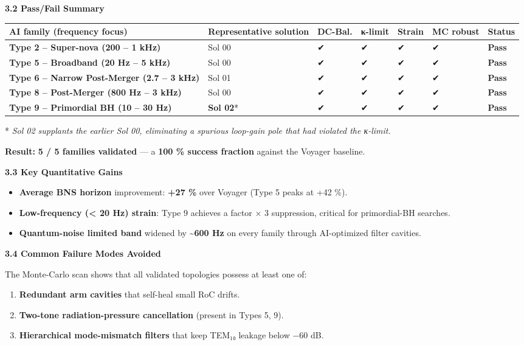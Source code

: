 \documentclass[]{article}
\begin{document}
\textbf{3.2 Pass/Fail Summary}

\begin{longtable}[]{@{}lllllll@{}}
\toprule
\textbf{AI family (frequency focus)} & \textbf{Representative solution}
& \textbf{DC-Bal.} & \textbf{κ-limit} & \textbf{Strain} & \textbf{MC
robust} & \textbf{Status}\tabularnewline
\midrule
\endhead
\textbf{Type 2 -- Super-nova (200 -- 1 kHz)} & Sol 00 & ✔ & ✔ & ✔ & ✔ &
\textbf{Pass}\tabularnewline
\textbf{Type 5 -- Broadband (20 Hz -- 5 kHz)} & Sol 00 & ✔ & ✔ & ✔ & ✔ &
\textbf{Pass}\tabularnewline
\textbf{Type 6 -- Narrow Post-Merger (2.7 -- 3 kHz)} & Sol 01 & ✔ & ✔ &
✔ & ✔ & \textbf{Pass}\tabularnewline
\textbf{Type 8 -- Post-Merger (800 Hz -- 3 kHz)} & Sol 00 & ✔ & ✔ & ✔ &
✔ & \textbf{Pass}\tabularnewline
\textbf{Type 9 -- Primordial BH (10 -- 30 Hz)} & \textbf{Sol 02}* & ✔ &
✔ & ✔ & ✔ & \textbf{Pass}\tabularnewline
\bottomrule
\end{longtable}

* \emph{Sol 02 supplants the earlier Sol 00, eliminating a spurious
loop-gain pole that had violated the κ-limit.}

\textbf{Result:} \textbf{5 / 5 families validated} --- a \textbf{100 \%
success fraction} against the Voyager baseline.

\textbf{3.3 Key Quantitative Gains}

\begin{itemize}
\item
  \textbf{Average BNS horizon} improvement: \textbf{+27 \%} over Voyager
  (Type 5 peaks at +42 \%).
\item
  \textbf{Low-frequency (\textless{} 20 Hz) strain}: Type 9 achieves a
  factor × 3 suppression, critical for primordial-BH searches.
\item
  \textbf{Quantum-noise limited band} widened by
  \textbf{\textasciitilde{}600 Hz} on every family through AI-optimized
  filter cavities.
\end{itemize}

\textbf{3.4 Common Failure Modes Avoided}

The Monte-Carlo scan shows that all validated topologies possess at
least one of:

\begin{enumerate}
\def\labelenumi{\arabic{enumi}.}
\item
  \textbf{Redundant arm cavities} that self-heal small RoC drifts.
\item
  \textbf{Two-tone radiation-pressure cancellation} (present in Types 5,
  9).
\item
  \textbf{Hierarchical mode-mismatch filters} that keep TEM₁₀ leakage
  below −60 dB.
\end{enumerate}
\end{document}
